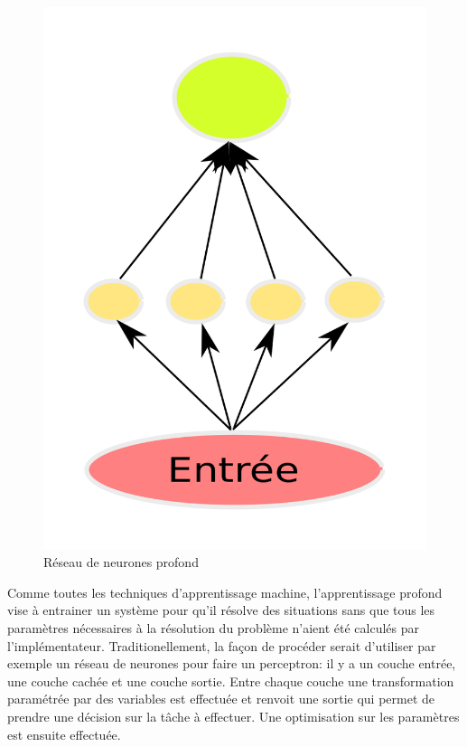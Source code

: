\documentclass[a4paper, 11pt, onecolumn]{article}
\begin{document}
\begin{figure}[!tbp]
\begin{minipage}[b]{0.3\textwidth}
    \includegraphics[width=\textwidth]{Shallow}
    \caption{Réseau de neurones profond}
  \end{minipage}
\end{figure}

Comme toutes les techniques d'apprentissage machine, l'apprentissage profond
vise à entrainer un système pour qu'il résolve des situations sans que tous les
paramètres nécessaires à la résolution du problème n'aient été calculés par
l'implémentateur. Traditionellement, la façon de procéder serait d'utiliser par
exemple un réseau de neurones pour faire un perceptron: il y a un couche entrée,
une couche cachée et une couche sortie. Entre chaque couche une transformation
paramétrée par des variables est effectuée et renvoit une sortie qui permet de
prendre une décision sur la tâche à effectuer. Une optimisation sur les paramètres est
ensuite effectuée.
\end{document}
